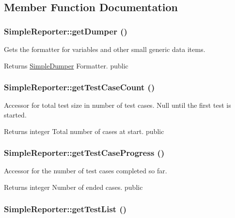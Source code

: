 \subsection{Member Function Documentation}
\hypertarget{class_simple_reporter_a784aae8c64539f2ac2f7bb8e9db65628}{
\subsubsection[{getDumper}]{\setlength{\rightskip}{0pt plus 5cm}SimpleReporter::getDumper ()}}
\label{class_simple_reporter_a784aae8c64539f2ac2f7bb8e9db65628}
Gets the formatter for variables and other small generic data items. \begin{DoxyReturn}{Returns}
\hyperlink{class_simple_dumper}{SimpleDumper} Formatter.  public 
\end{DoxyReturn}
\hypertarget{class_simple_reporter_a218fb7c8ac145e848243d29d712fd27f}{
\subsubsection[{getTestCaseCount}]{\setlength{\rightskip}{0pt plus 5cm}SimpleReporter::getTestCaseCount ()}}
\label{class_simple_reporter_a218fb7c8ac145e848243d29d712fd27f}
Accessor for total test size in number of test cases. Null until the first test is started. \begin{DoxyReturn}{Returns}
integer Total number of cases at start.  public 
\end{DoxyReturn}
\hypertarget{class_simple_reporter_aa9b00069b10e54522095ef9d65dddd44}{
\subsubsection[{getTestCaseProgress}]{\setlength{\rightskip}{0pt plus 5cm}SimpleReporter::getTestCaseProgress ()}}
\label{class_simple_reporter_aa9b00069b10e54522095ef9d65dddd44}
Accessor for the number of test cases completed so far. \begin{DoxyReturn}{Returns}
integer Number of ended cases.  public 
\end{DoxyReturn}
\hypertarget{class_simple_reporter_aa4bce8bfcd41c7ec33a22866f2b170a9}{
\subsubsection[{getTestList}]{\setlength{\rightskip}{0pt plus 5cm}SimpleReporter::getTestList ()}}
